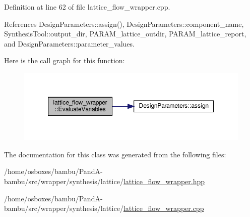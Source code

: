 Definition at line 62 of file lattice\+\_\+flow\+\_\+wrapper.\+cpp.



References Design\+Parameters\+::assign(), Design\+Parameters\+::component\+\_\+name, Synthesis\+Tool\+::output\+\_\+dir, P\+A\+R\+A\+M\+\_\+lattice\+\_\+outdir, P\+A\+R\+A\+M\+\_\+lattice\+\_\+report, and Design\+Parameters\+::parameter\+\_\+values.

Here is the call graph for this function\+:
\nopagebreak
\begin{figure}[H]
\begin{center}
\leavevmode
\includegraphics[width=350pt]{de/d90/classlattice__flow__wrapper_a731ddad3888b81665926537dfe415269_cgraph}
\end{center}
\end{figure}


The documentation for this class was generated from the following files\+:\begin{DoxyCompactItemize}
\item 
/home/osboxes/bambu/\+Pand\+A-\/bambu/src/wrapper/synthesis/lattice/\hyperlink{lattice__flow__wrapper_8hpp}{lattice\+\_\+flow\+\_\+wrapper.\+hpp}\item 
/home/osboxes/bambu/\+Pand\+A-\/bambu/src/wrapper/synthesis/lattice/\hyperlink{lattice__flow__wrapper_8cpp}{lattice\+\_\+flow\+\_\+wrapper.\+cpp}\end{DoxyCompactItemize}
